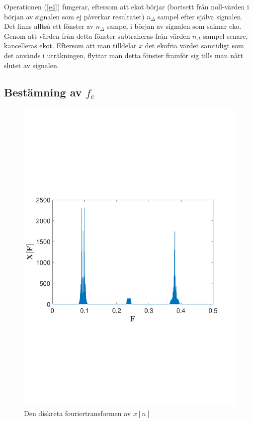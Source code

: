 \documentclass[10pt,twocolumn,a4paper]{article}
\begin{document}
Operationen (\ref{e4}) fungerar, eftersom att ekot börjar (bortsett från
noll-värden i början av signalen som ej påverkar resultatet) $n_\Delta$
sampel efter själva signalen. Det finns alltså ett fönster av $n_\Delta$
sampel i början av signalen som saknar eko. Genom att värden från detta fönster
subtraheras från värden $n_\Delta$ sampel senare, kancelleras ekot. Eftersom
att man tilldelar $x$ det ekofria värdet samtidigt som det används
i uträkningen, flyttar man detta fönster framför sig tills man nått slutet av
signalen.

\subsection{Bestämning av $f_c$}
\begin{figure}[width=\textwidth]

    \includegraphics[trim = 0 80mm 0 90mm, clip, width=\linewidth]{fig2.pdf}
    \caption{
        Den diskreta fouriertransformen av $x[n]$ 
        \label{fig:X}
    }
\end{figure}
\end{document}
